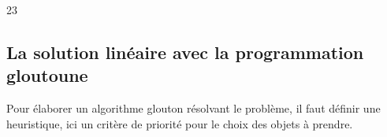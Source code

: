 \documentclass[letterpaper,10pt,english]{jupyterBook}
\begin{document}
\begin{sphinxVerbatimInput}

\begin{sphinxVerbatim}[commandchars=\\\{\}]
\end{sphinxVerbatim}
\end{sphinxVerbatimInput}
\begin{sphinxVerbatimOutput}

\begin{sphinxVerbatim}[commandchars=\\\{\}]
23
\end{sphinxVerbatim}
\end{sphinxVerbatimOutput}


\subsection{La solution linéaire avec la programmation gloutoune}
\label{\detokenize{notebooks/dynamicProgramming/ProgrammationDynamique:la-solution-lineaire-avec-la-programmation-gloutoune}}
\sphinxAtStartPar
{}



\sphinxAtStartPar
Pour élaborer un algorithme glouton résolvant le problème, il faut définir une heuristique, ici un critère de
priorité pour le choix des objets à prendre.
\end{document}
